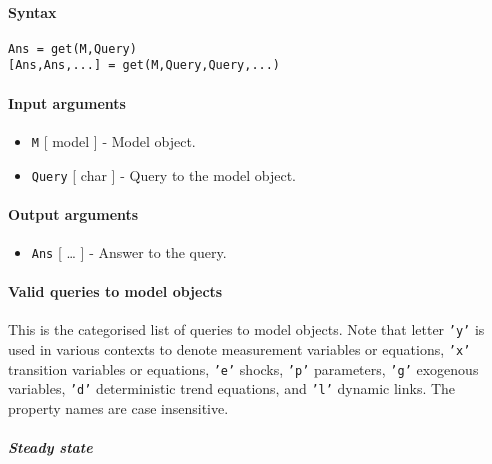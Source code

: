 


	\paragraph{Syntax}

\begin{verbatim}
Ans = get(M,Query)
[Ans,Ans,...] = get(M,Query,Query,...)
\end{verbatim}

\paragraph{Input arguments}

\begin{itemize}
\item
  \texttt{M} {[} model {]} - Model object.
\item
  \texttt{Query} {[} char {]} - Query to the model object.
\end{itemize}

\paragraph{Output arguments}

\begin{itemize}
\itemsep1pt\parskip0pt
\item
  \texttt{Ans} {[} \ldots{} {]} - Answer to the query.
\end{itemize}

\paragraph{Valid queries to model
objects}

This is the categorised list of queries to model objects. Note that
letter \texttt{'y'} is used in various contexts to denote measurement
variables or equations, \texttt{'x'} transition variables or equations,
\texttt{'e'} shocks, \texttt{'p'} parameters, \texttt{'g'} exogenous
variables, \texttt{'d'} deterministic trend equations, and \texttt{'l'}
dynamic links. The property names are case insensitive.

\subparagraph{Steady state}

